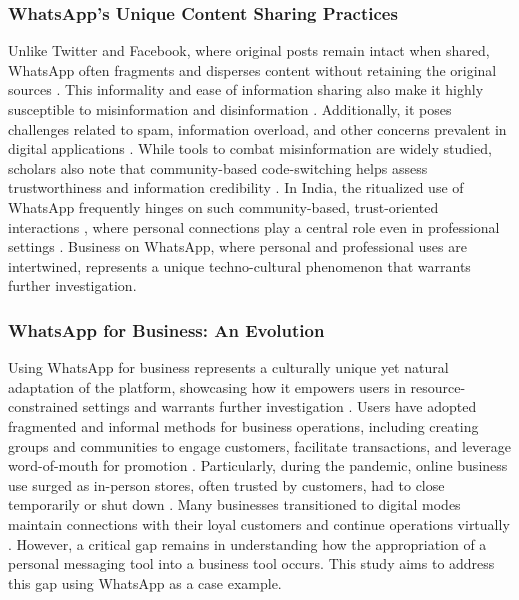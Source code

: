 \subsubsection{WhatsApp's Unique Content Sharing Practices}
Unlike Twitter and Facebook, where original posts remain intact when shared, WhatsApp often fragments and disperses content without retaining the original sources \cite{10.1145/3512964}. This informality and ease of information sharing also make it highly susceptible to misinformation and disinformation \cite{paris2024hidden, 10.1145/3641010, 10.1145/3432948}. Additionally, it poses challenges related to spam, information overload, and other concerns prevalent in digital applications \cite{shahid2024one}. While tools to combat misinformation are widely studied, scholars also note that community-based code-switching helps assess trustworthiness and information credibility \cite{10.1145/3637429}. In India, the ritualized use of WhatsApp frequently hinges on such community-based, trust-oriented interactions \cite{10.1145/3613905.3651034, 10.1145/3491102.3517575}, where personal connections play a central role even in professional settings \cite{Durgungoz2022, 10.1145/3411764.3445221}. Business on WhatsApp, where personal and professional uses are intertwined, represents a unique techno-cultural phenomenon that warrants further investigation.

\subsubsection{WhatsApp for Business: An Evolution}

Using WhatsApp for business represents a culturally unique yet natural adaptation of the platform, showcasing how it empowers users in resource-constrained settings and warrants further investigation \cite{10.1145/3555584}. Users have adopted fragmented and informal methods for business operations, including creating groups and communities to engage customers, facilitate transactions, and leverage word-of-mouth for promotion \cite{10.1145/3613905.3651034, Sugiyantoro2022, modak2017dancing, kottani2021study, bagdare2021whatsapp}. Particularly, during the pandemic, online business use surged as in-person stores, often trusted by customers, had to close temporarily or shut down \cite{sumarni2022utilization, Sugiyantoro2022}. Many businesses transitioned to digital modes maintain connections with their loyal customers and continue operations virtually \cite{doi:10.1177/20501579241246721}. However, a critical gap remains in understanding how the appropriation of a personal messaging tool into a business tool occurs. This study aims to address this gap using WhatsApp as a case example.


